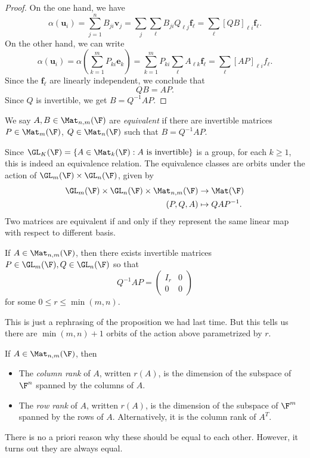 \documentclass[a4paper]{article}
\begin{document}
\begin{proof}
  On the one hand, we have
  \[
    \alpha(\mathbf{u}_i) = \sum_{j = 1}^n B_{ji}\mathbf{v}_j = \sum_j\sum_\ell B_{ji} Q_{\ell j}\mathbf{f}_\ell = \sum_\ell [QB]_{\ell i}\mathbf{f}_\ell.
  \]
  On the other hand, we can write
  \[
    \alpha (\mathbf{u}_i) = \alpha \left(\sum_{k = 1}^m P_{ki}\mathbf{e}_k\right) = \sum_{k = 1}^m P_{ki} \sum_\ell A_{\ell k}\mathbf{f}_\ell = \sum_{\ell}[AP]_{\ell i} f_\ell.
  \]
  Since the $\mathbf{f}_\ell$ are linearly independent, we conclude that
  \[
    QB = AP.
  \]
  Since $Q$ is invertible, we get $B = Q^{-1}AP$.
\end{proof}

\begin{defi}
  We say $A, B\in \Mat_{n, m}(\F)$ are \emph{equivalent} if there are invertible matrices $P\in\Mat_{m}(\F)$, $Q\in \Mat_n (\F)$ such that $B = Q^{-1}AP$.
\end{defi}
Since $\GL_K(\F) = \{A \in \Mat_k(\F): A\text{ is invertible}\}$ is a group, for each $k \geq 1$, this is indeed an equivalence relation. The equivalence classes are orbits under the action of $\GL_m(\F) \times \GL_n(\F)$, given by
\begin{align*}
  \GL_m(\F) \times \GL_n(\F)\times \Mat_{n, m}(\F) &\to \Mat (\F)\\
  (P, Q, A) &\mapsto QAP^{-1}.
\end{align*}
Two matrices are equivalent if and only if they represent the same linear map with respect to different basis.

\begin{cor}
  If $A\in \Mat_{n, m}(\F)$, then there exists invertible matrices $P \in \GL_m(\F), Q\in \GL_n(\F)$ so that
  \[
    Q^{-1}AP =
    \begin{pmatrix}
      I_r & 0\\
      0 & 0
    \end{pmatrix}
  \]
  for some $0 \leq r \leq \min(m, n)$.
\end{cor}
This is just a rephrasing of the proposition we had last time. But this tells us there are $\min(m, n) + 1$ orbits of the action above parametrized by $r$.

\begin{defi}
  If $A\in \Mat_{n, m}(\F)$, then
  \begin{itemize}
    \item The \emph{column rank} of $A$, written $r(A)$, is the dimension of the subspace of $\F^n$ spanned by the columns of $A$.
    \item The \emph{row rank} of $A$, written $r(A)$, is the dimension of the subspace of $\F^m$ spanned by the rows of $A$. Alternatively, it is the column rank of $A^T$.
  \end{itemize}
\end{defi}
There is no a priori reason why these should be equal to each other. However, it turns out they are always equal.
\end{document}
